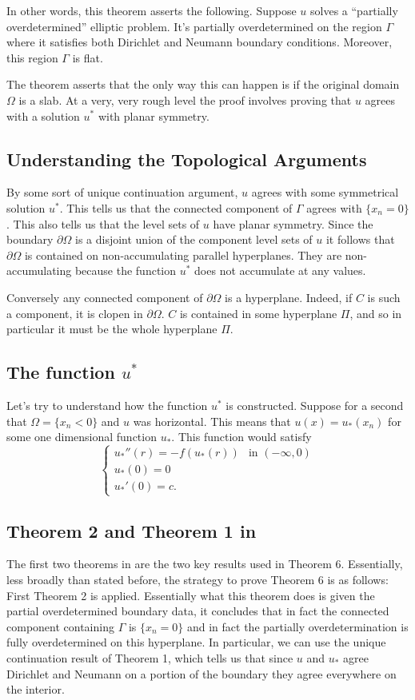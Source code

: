 In other words, this theorem asserts the following. Suppose $u$ solves a ``partially overdetermined'' elliptic problem. It's partially overdetermined on the region $\Gamma$ where it satisfies both Dirichlet and Neumann boundary conditions. Moreover, this region $\Gamma$ is flat.

The theorem asserts that the only way this can happen is if the original domain $\Omega$ is a slab. At a very, very rough level the proof involves proving that $u$ agrees with a solution $u^*$ with planar symmetry.

\subsection{Understanding the Topological Arguments}

By some sort of unique continuation argument, $u$ agrees with some symmetrical solution $u^*$. This tells us that the connected component of $\Gamma$ agrees with $\{x_n = 0\}$. This also tells us that the level sets of $u$ have planar symmetry. Since the boundary $\partial \Omega$ is a disjoint union of the component level sets of $u$ it follows that $\partial \Omega$ is contained on non-accumulating parallel hyperplanes. They are non-accumulating because the function $u^*$ does not accumulate at any values.

Conversely any connected component of $\partial \Omega$ is a hyperplane. Indeed, if $C$ is such a component, it is clopen in $\partial \Omega$. $C$ is contained in some hyperplane $\Pi$, and so in particular it must be the whole hyperplane $\Pi$.

\subsection{The function $u^*$}
Let's try to understand how the function $u^*$ is constructed. Suppose for a second that $\Omega = \{x_n < 0\}$ and $u$ was horizontal. This means that $u(x) = u_*(x_n)$ for some one dimensional function $u_*$. This function would satisfy
\[
\begin{cases}
    u_*''(r) = -f(u_*(r)) & \text{in $(-\infty, 0)$} \\
    u_*(0) = 0 & \\
    u_*'(0) = c.
\end{cases}
\]

\subsection{Theorem 2 and Theorem 1 in \cite{FV13}}

The first two theorems in \cite{FV13} are the two key results used in Theorem 6. Essentially, less broadly than stated before, the strategy to prove Theorem 6 is as follows: First Theorem 2 is applied. Essentially what this theorem does is given the partial overdetermined boundary data, it concludes that in fact the connected component containing $\Gamma$ is $\{x_n = 0\}$ and in fact the partially overdetermination is fully overdetermined on this hyperplane. In particular, we can use the unique continuation result of Theorem 1, which tells us that since $u$ and $u_*$ agree Dirichlet and Neumann on a portion of the boundary they agree everywhere on the interior. 

